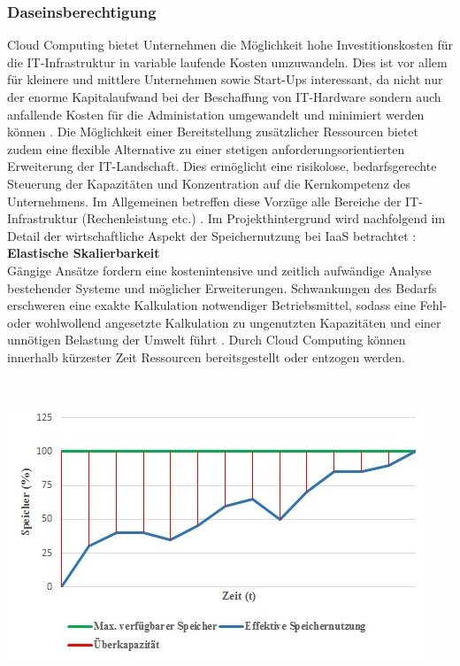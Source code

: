 \documentclass[13pt,a4paper,bibliography=totocnumbered,listof=totocnumbered]{scrartcl}
\begin{document}
\subsubsection{Daseinsberechtigung}\label{CloudV}
Cloud Computing bietet Unternehmen die Möglichkeit hohe Investitionskosten für die IT-Infrastruktur in variable laufende Kosten umzuwandeln. Dies ist vor allem für kleinere und mittlere Unternehmen sowie Start-Ups interessant, da nicht nur der enorme Kapitalaufwand bei der Beschaffung von IT-Hardware sondern auch anfallende Kosten für die Administation umgewandelt und minimiert werden können \cite[S. 78]{45}. Die Möglichkeit einer Bereitstellung zusätzlicher Ressourcen bietet zudem eine flexible Alternative zu einer stetigen anforderungsorientierten Erweiterung der IT-Landschaft. Dies ermöglicht eine risikolose, bedarfsgerechte Steuerung der Kapazitäten und Konzentration auf die Kernkompetenz des Unternehmens. Im Allgemeinen betreffen diese Vorzüge alle Bereiche der IT-Infrastruktur (Rechenleistung etc.) \cite[S. 35]{39}. Im Projekthintergrund wird nachfolgend im Detail der wirtschaftliche Aspekt der Speichernutzung bei IaaS betrachtet \cite[S. 35ff.]{39}:\\

\textbf{Elastische Skalierbarkeit}\\
Gängige Ansätze fordern eine kostenintensive und zeitlich aufwändige Analyse bestehender Systeme und möglicher Erweiterungen. Schwankungen des Bedarfs erschweren eine exakte Kalkulation notwendiger Betriebsmittel, sodass eine Fehl- oder wohlwollend angesetzte Kalkulation zu ungenutzten Kapazitäten und einer unnötigen Belastung der Umwelt führt \cite[S. 91ff.]{45}. Durch Cloud Computing können innerhalb kürzester Zeit Ressourcen bereitsgestellt oder entzogen werden.

\vspace{1em}
$\;$\\
\begin{minipage}{\linewidth}
	\centering
	\includegraphics[width=1.0\linewidth]{./img/Speicher.jpg}
 	\label{SpeicherV}
\end{minipage}
\vspace{1em}
\end{document}
